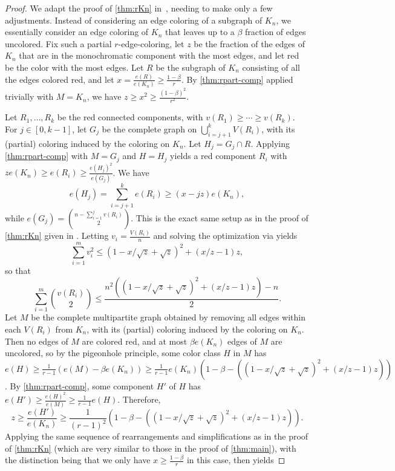 \documentclass[12pt]{amsart}
\theoremstyle{definition}
\numberwithin{equation}{section}
\begin{document}
\begin{proof}
    We adapt the proof of \cref{thm:rKn} in~\cite{sluo}, needing to make only a few adjustments. 
    Instead of considering an edge coloring of a subgraph of $K_n$, we essentially consider an edge coloring of $K_n$ that leaves up to a $\beta$ fraction of edges uncolored. Fix such a partial $r$-edge-coloring, let $z$ be the fraction of the edges of $K_n$ that are in the monochromatic component with the most edges, and let red be the color with the most edges. Let $R$ be the subgraph of $K_n$ consisting of all the edges colored red, and let $x=\frac{e(R)}{e(K_n)}\ge \frac{1-\beta}{r}$. By \cref{thm:rpart-comp} applied trivially with $M=K_n$, we have $z\ge x^2\ge \frac{(1-\beta)^2}{r^2}$.

    Let $R_1,\dots, R_k$ be the red connected components, with $v(R_1)\ge\cdots\ge v(R_k)$. For $j\in [0, k-1]$, let $G_j$ be the complete graph on $\bigcup_{i={j+1}}^k V(R_i)$, with its (partial) coloring induced by the coloring on $K_n$. Let $H_j=G_j\cap R$. 
    Applying \cref{thm:rpart-comp} with $M=G_j$ and $H=H_j$ yields a red component $R_i$ with $ze(K_n)\ge e(R_i)\ge \frac{e(H_j)^2}{e(G_j)}$. We have
    \[e(H_j) = \sum_{i=j+1}^k e(R_i) \ge (x-jz)e(K_n),\]
    while
    $e(G_j) = {{n-\sum_{i=1}^j v(R_i)}\choose 2}.$
    This is the exact same setup as in the proof of \cref{thm:rKn} given in \cite{sluo}. 
    Letting $v_i=\frac{V(R_i)}{n}$ and solving the optimization via \cite[Lemma~3.2]{sluo} yields
    \[\sum_{i=1}^m v_i^2\le (1-x/\sqrt{z}+\sqrt{ z})^2+(x/z-1)z ,\]
    so that
    \[\sum_{i=1}^m {{v(R_i)}\choose 2} \le \frac{n^2((1-x/\sqrt{z}+\sqrt{ z})^2+(x/z-1)z)-n}2.\]
    Let $M$ be the complete multipartite graph obtained by removing all edges within each $V(R_i)$ from $K_n$, with its (partial) coloring induced by the coloring on $K_n$. Then no edges of $M$ are colored red, and at most $\beta e(K_n)$ edges of $M$ are uncolored, so by the pigeonhole principle, some color class $H$ in $M$ has $e(H)\ge \frac1{r-1}(e(M)-\beta e(K_n))\ge \frac{1}{r-1}e(K_n)(1-\beta - ((1-x/\sqrt{z}+\sqrt{ z})^2+(x/z-1)z))$. By \cref{thm:rpart-comp}, some component $H'$ of $H$ has $e(H')\ge \frac{e(H)^2}{e(M)}\ge \frac{1}{r-1}e(H)$. Therefore,
    \[z\ge \frac{e(H')}{e(K_n)}\ge \frac{1}{(r-1)^2}(1-\beta - ((1-x/\sqrt{z}+\sqrt{ z})^2+(x/z-1)z)).\]
    Applying the same sequence of rearrangements and simplifications as in the proof of \cref{thm:rKn} (which are very similar to those in the proof of \cref{thm:main}), with the distinction being that we only have $x\ge \frac{1-\beta}{r}$ in this case, then yields

\end{proof}
\end{document}
